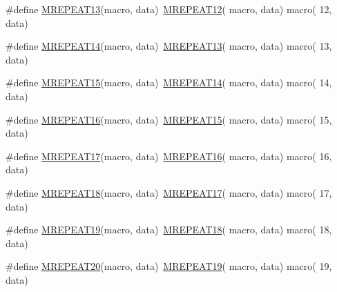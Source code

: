 \begin{DoxyCompactItemize}
\item 
\#define \mbox{\hyperlink{group__group__sam0__utils__mrepeat_ga235cc5c4e4fb84c9d44ee4b5b5b4a7d1}{M\+R\+E\+P\+E\+A\+T13}}(macro,  data)~\mbox{\hyperlink{group__group__sam0__utils__mrepeat_ga5e8405725939e1548f4c09088bb9284a}{M\+R\+E\+P\+E\+A\+T12}}( macro, data)   macro( 12, data)
\item 
\#define \mbox{\hyperlink{group__group__sam0__utils__mrepeat_gab75712b9509bac034c07db02ea0e0485}{M\+R\+E\+P\+E\+A\+T14}}(macro,  data)~\mbox{\hyperlink{group__group__sam0__utils__mrepeat_ga235cc5c4e4fb84c9d44ee4b5b5b4a7d1}{M\+R\+E\+P\+E\+A\+T13}}( macro, data)   macro( 13, data)
\item 
\#define \mbox{\hyperlink{group__group__sam0__utils__mrepeat_gaa3c5de4c7a937ef2f00049285ed41a0a}{M\+R\+E\+P\+E\+A\+T15}}(macro,  data)~\mbox{\hyperlink{group__group__sam0__utils__mrepeat_gab75712b9509bac034c07db02ea0e0485}{M\+R\+E\+P\+E\+A\+T14}}( macro, data)   macro( 14, data)
\item 
\#define \mbox{\hyperlink{group__group__sam0__utils__mrepeat_gaf3c066d33ccd6fd8378495955121baae}{M\+R\+E\+P\+E\+A\+T16}}(macro,  data)~\mbox{\hyperlink{group__group__sam0__utils__mrepeat_gaa3c5de4c7a937ef2f00049285ed41a0a}{M\+R\+E\+P\+E\+A\+T15}}( macro, data)   macro( 15, data)
\item 
\#define \mbox{\hyperlink{group__group__sam0__utils__mrepeat_gaff45aee56d734a3bdf90cdd86b5693d9}{M\+R\+E\+P\+E\+A\+T17}}(macro,  data)~\mbox{\hyperlink{group__group__sam0__utils__mrepeat_gaf3c066d33ccd6fd8378495955121baae}{M\+R\+E\+P\+E\+A\+T16}}( macro, data)   macro( 16, data)
\item 
\#define \mbox{\hyperlink{group__group__sam0__utils__mrepeat_gaeac781e6017f799e59bfc8d46e5cc9a1}{M\+R\+E\+P\+E\+A\+T18}}(macro,  data)~\mbox{\hyperlink{group__group__sam0__utils__mrepeat_gaff45aee56d734a3bdf90cdd86b5693d9}{M\+R\+E\+P\+E\+A\+T17}}( macro, data)   macro( 17, data)
\item 
\#define \mbox{\hyperlink{group__group__sam0__utils__mrepeat_ga9062731e6246bd538334f265e34870df}{M\+R\+E\+P\+E\+A\+T19}}(macro,  data)~\mbox{\hyperlink{group__group__sam0__utils__mrepeat_gaeac781e6017f799e59bfc8d46e5cc9a1}{M\+R\+E\+P\+E\+A\+T18}}( macro, data)   macro( 18, data)
\item 
\#define \mbox{\hyperlink{group__group__sam0__utils__mrepeat_ga938b8f75b8eedaadcfec2c375f7c7d2a}{M\+R\+E\+P\+E\+A\+T20}}(macro,  data)~\mbox{\hyperlink{group__group__sam0__utils__mrepeat_ga9062731e6246bd538334f265e34870df}{M\+R\+E\+P\+E\+A\+T19}}( macro, data)   macro( 19, data)

\end{DoxyCompactItemize}
